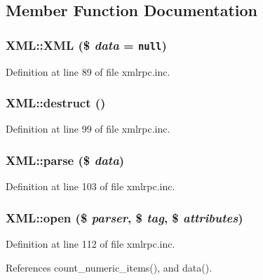 \subsection{Member Function Documentation}
\hypertarget{classXML_1475a1374023931e2227277f4047c9aa}{
\subsubsection{\setlength{\rightskip}{0pt plus 5cm}XML::XML (\$ {\em data} = {\tt null})}}
\label{classXML_1475a1374023931e2227277f4047c9aa}




Definition at line 89 of file xmlrpc.inc.\hypertarget{classXML_d1524d80c783b2cd22966462411b9b7d}{
\subsubsection{\setlength{\rightskip}{0pt plus 5cm}XML::destruct ()}}
\label{classXML_d1524d80c783b2cd22966462411b9b7d}




Definition at line 99 of file xmlrpc.inc.\hypertarget{classXML_61e6258dc3d5750100e1f0dd08d6334a}{
\subsubsection{\setlength{\rightskip}{0pt plus 5cm}XML::parse (\$ {\em data})}}
\label{classXML_61e6258dc3d5750100e1f0dd08d6334a}




Definition at line 103 of file xmlrpc.inc.\hypertarget{classXML_eac7eae74d866d4f5a0cdb9be27ff279}{
\subsubsection{\setlength{\rightskip}{0pt plus 5cm}XML::open (\$ {\em parser}, \$ {\em tag}, \$ {\em attributes})}}
\label{classXML_eac7eae74d866d4f5a0cdb9be27ff279}




Definition at line 112 of file xmlrpc.inc.

References count\_\-numeric\_\-items(), and data().

